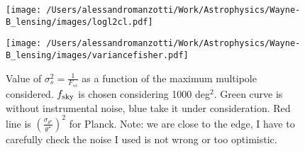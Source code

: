 \begin{figure}[htbp]
\begin{center}
\texttt{[image: /Users/alessandromanzotti/Work/Astrophysics/Wayne-B\_lensing/images/logl2cl.pdf]}
\end{center}
\end{figure}
\begin{figure}[htbp]
\begin{center}
\texttt{[image: /Users/alessandromanzotti/Work/Astrophysics/Wayne-B\_lensing/images/variancefisher.pdf]}
\caption{Value of $\sigma^{2}_{s}=\frac{1}{F_{ss}}$ as a function of the maximum multipole considered. $f_{\rm{sky}}$ is chosen considering 1000 deg$^{2}$. Green curve is without instrumental noise, blue take it under consideration. Red line is 
$(\frac{\sigma_{\theta^{\star}}}{\theta^{\star}})^{2}$ for Planck. Note: we are close to the edge, I have to carefully check the noise I used is not wrong or too optimistic.}
\end{center}
\end{figure}

